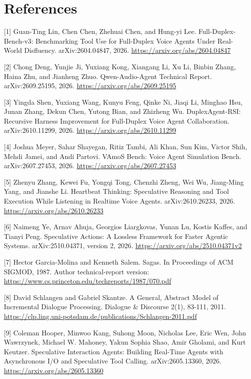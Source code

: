 \documentclass[review,12pt]{elsarticle}
\begin{document}
\section*{References}

[1] Guan-Ting Lin, Chen Chen, Zhehuai Chen, and Hung-yi Lee. Full-Duplex-Bench-v3: Benchmarking Tool Use for Full-Duplex Voice Agents Under Real-World Disfluency. arXiv:2604.04847, 2026. \url{https://arxiv.org/abs/2604.04847}


[2] Chong Deng, Yunjie Ji, Yuxiang Kong, Xiangang Li, Xu Li, Binbin Zhang, Haina Zhu, and Jianheng Zhuo. Qwen-Audio-Agent Technical Report. arXiv:2609.25195, 2026. \url{https://arxiv.org/abs/2609.25195}


[3] Yingda Shen, Yuxiang Wang, Kunyu Feng, Qinke Ni, Jiaqi Li, Minghao Hsu, Junan Zhang, Dekun Chen, Yutong Bian, and Zhizheng Wu. DuplexAgent-RSI: Recursive Harness Improvement for Full-Duplex Voice Agent Collaboration. arXiv:2610.11299, 2026. \url{https://arxiv.org/abs/2610.11299}


[4] Joshua Meyer, Sahar Shayegan, Ritiz Tambi, Ali Khan, Sun Kim, Victor Shih, Mehdi Jamei, and Andi Partovi. VAmoS Bench: Voice Agent Simulation Bench. arXiv:2607.27453, 2026. \url{https://arxiv.org/abs/2607.27453}


[5] Zhenyu Zhang, Kewei Fu, Yongqi Tong, Chenzhi Zheng, Wei Wu, Jiang-Ming Yang, and Jianshe Li. Heartbeat Thinking: Speculative Reasoning and Tool Execution While Listening in Realtime Voice Agents. arXiv:2610.26233, 2026. \url{https://arxiv.org/abs/2610.26233}


[6] Naimeng Ye, Arnav Ahuja, Georgios Liargkovas, Yunan Lu, Kostis Kaffes, and Tianyi Peng. Speculative Actions: A Lossless Framework for Faster Agentic Systems. arXiv:2510.04371, version 2, 2026. \url{https://arxiv.org/abs/2510.04371v2}


[7] Hector Garcia-Molina and Kenneth Salem. Sagas. In Proceedings of ACM SIGMOD, 1987. Author technical-report version: \url{https://www.cs.princeton.edu/techreports/1987/070.pdf}


[8] David Schlangen and Gabriel Skantze. A General, Abstract Model of Incremental Dialogue Processing. Dialogue \& Discourse 2(1), 83-111, 2011. \url{https://clp.ling.uni-potsdam.de/publications/Schlangen-2011.pdf}


[9] Coleman Hooper, Minwoo Kang, Suhong Moon, Nicholas Lee, Eric Wen, John Wawrzynek, Michael W. Mahoney, Yakun Sophia Shao, Amir Gholami, and Kurt Keutzer. Speculative Interaction Agents: Building Real-Time Agents with Asynchronous I/O and Speculative Tool Calling. arXiv:2605.13360, 2026. \url{https://arxiv.org/abs/2605.13360}
\end{document}
